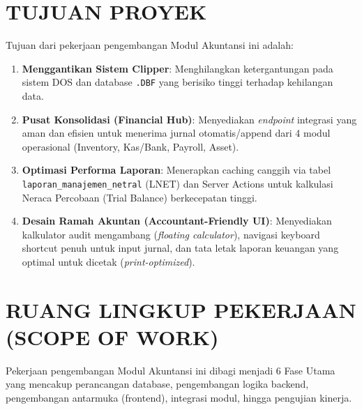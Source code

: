\documentclass[11pt,a4paper]{article}
\begin{document}
\section{TUJUAN PROYEK}
Tujuan dari pekerjaan pengembangan Modul Akuntansi ini adalah:
\begin{enumerate}
    \item \textbf{Menggantikan Sistem Clipper}: Menghilangkan ketergantungan pada sistem DOS dan database \texttt{.DBF} yang berisiko tinggi terhadap kehilangan data.
    \item \textbf{Pusat Konsolidasi (Financial Hub)}: Menyediakan \textit{endpoint} integrasi yang aman dan efisien untuk menerima jurnal otomatis/append dari 4 modul operasional (Inventory, Kas/Bank, Payroll, Asset).
    \item \textbf{Optimasi Performa Laporan}: Menerapkan caching canggih via tabel \texttt{laporan\_manajemen\_netral} (LNET) dan Server Actions untuk kalkulasi Neraca Percobaan (Trial Balance) berkecepatan tinggi.
    \item \textbf{Desain Ramah Akuntan (Accountant-Friendly UI)}: Menyediakan kalkulator audit mengambang (\textit{floating calculator}), navigasi keyboard shortcut penuh untuk input jurnal, dan tata letak laporan keuangan yang optimal untuk dicetak (\textit{print-optimized}).
\end{enumerate}

\newpage

\section{RUANG LINGKUP PEKERJAAN (SCOPE OF WORK)}
Pekerjaan pengembangan Modul Akuntansi ini dibagi menjadi 6 Fase Utama yang mencakup perancangan database, pengembangan logika backend, pengembangan antarmuka (frontend), integrasi modul, hingga pengujian kinerja.
\end{document}
